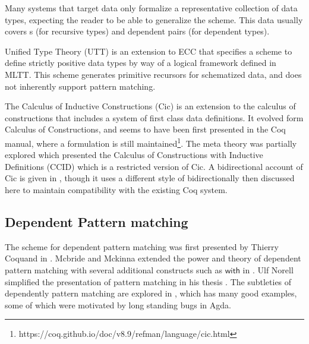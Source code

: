 Many systems that target data only formalize a representative collection of data types, expecting the reader to be able to generalize the scheme.
This data usually covers \Nat{}s (for recursive types) and dependent pairs (for dependent types). %



Unified Type Theory (\ac{UTT})\cite{luo1990extended,luo1994computation} is an extension to \ac{ECC} that specifies a scheme to define strictly positive data types by way of a logical framework defined in \ac{MLTT}.
This scheme generates primitive recursors for schematized data, and does not inherently support pattern matching.

The Calculus of Inductive Constructions (\ac{Cic}) is an extension to the calculus of constructions that includes a system of first class data definitions.
It evolved form Calculus of Constructions, and seems to have been first presented in the Coq manual, where a formulation is still maintained\footnote{https://coq.github.io/doc/v8.9/refman/language/cic.html}.
The meta theory was partially explored \cite{10.1007/BFb0037116} which presented the  Calculus of Constructions with Inductive Definitions (CCID) which is a restricted version of \ac{Cic}.
A bidirectional account of \ac{Cic} is given in \cite{lennonbertrand:LIPIcs.ITP.2021.24}, though it uses a different style of bidirectionally then discussed here to maintain compatibility with the existing Coq system.


\subsection{Dependent Pattern matching}


The scheme for dependent pattern matching was first presented by Thierry Coquand in \cite{coquand1992pattern}.
Mcbride and Mckinna extended the power and theory of dependent pattern matching with several additional constructs such as $\mathsf{with}$ in \cite{mcbride_mckinna_2004}.
Ulf Norell simplified the presentation of pattern matching in his thesis \cite{norell2007towards}.
The subtleties of dependently pattern matching are explored in \cite{cockx_devriese_2018}, which has many good examples, some of which were motivated by long standing bugs in Agda.

